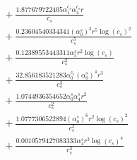 \documentclass[10pt]{article}
\begin{document}
\begin{align*}
&{}  + \frac{1.877679722405 \alpha_{1}^{c_s} \alpha_{4}^{c_s} r}{c_{s}} \\
&{}  + \frac{0.23604540334341 \left(\alpha_{0}^s\right)^{3} r^{5} \log{\left(c_{s} \right)}^{2}}{c_{s}^{5}} \\
&{}  + \frac{0.12389553443311 \alpha_{5}^s r^{2} \log{\left(c_{s} \right)}}{c_{s}^{2}} \\
&{}  + \frac{32.856183521283 \alpha_{0}^{c_s} \left(\alpha_{0}^s\right)^{4} r^{3}}{c_{s}^{3}} \\
&{}  + \frac{1.0744936354652 \alpha_{0}^s \alpha_{4}^s r^{2}}{c_{s}^{2}} \\
&{}  + \frac{1.0777306522894 \left(\alpha_{0}^s\right)^{6} r^{2} \log{\left(c_{s} \right)}^{2}}{c_{s}^{2}} \\
&{}  + \frac{0.0010579427083333 \alpha_{4}^s r^{3} \log{\left(c_{s} \right)}^{4}}{c_{s}^{3}}
\end{align*}
\end{document}
